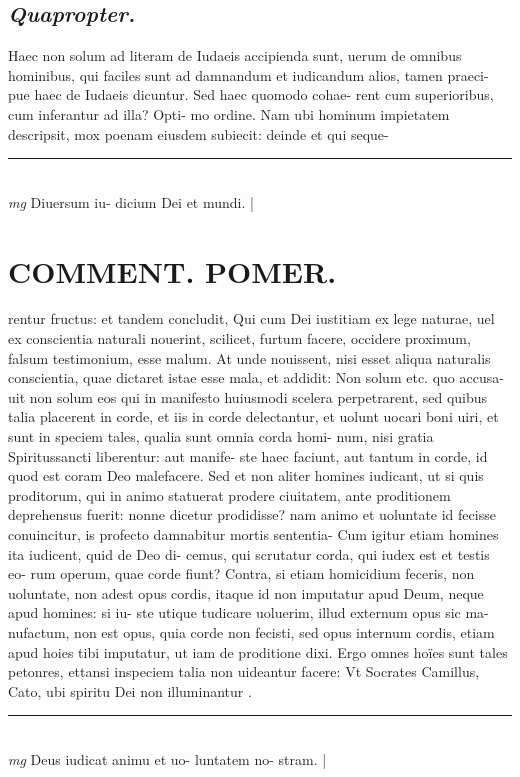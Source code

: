 \documentclass{article}
\begin{document}
\begin{pages}
\subsection*{\textit{Quapropter. }}\pstart Haec non solum ad literam de Iudaeis accipienda sunt, uerum de omnibus hominibus, qui faciles sunt ad damnandum et iudicandum alios, tamen praeci- pue haec de Iudaeis dicuntur. Sed haec quomodo cohae- rent cum superioribus, cum inferantur ad illa? Opti- mo ordine. Nam ubi hominum impietatem descripsit, mox poenam eiusdem subiecit: deinde et qui seque-  \pend
\vspace{0.5cm}\noindent
\vspace{0.2cm}\rule{1cm}{0.2pt}\\ 
\hspace{0.2cm}\textit{mg}
\footnotesize Diuersum iu- dicium Dei et mundi. 
\normalsize| 
\section*{COMMENT. POMER.  }\pstart rentur fructus: et tandem concludit, Qui cum Dei iustitiam ex lege naturae, uel ex conscientia naturali nouerint, scilicet, furtum facere, occidere proximum, falsum testimonium, esse malum. At unde nouissent, nisi esset aliqua naturalis conscientia, quae dictaret istae esse mala, et addidit: Non solum etc. quo accusa- uit non solum eos qui in manifesto huiusmodi scelera perpetrarent, sed quibus talia placerent in corde, et iis in corde delectantur, et uolunt uocari boni uiri, et sunt in speciem tales, qualia sunt omnia corda homi- num, nisi gratia Spiritussancti liberentur: aut manife- ste haec faciunt, aut tantum in corde, id quod est coram Deo malefacere. Sed et non aliter homines iudicant, ut si quis proditorum, qui in animo statuerat prodere ciuitatem, ante proditionem deprehensus fuerit: nonne dicetur prodidisse? nam animo et uoluntate id fecisse conuincitur, is profecto damnabitur mortis sententia- Cum igitur etiam homines ita iudicent, quid de Deo di- cemus, qui scrutatur corda, qui iudex est et testis eo- rum operum, quae corde fiunt? Contra, si etiam homicidium feceris, non uoluntate, non adest opus cordis, itaque  id non imputatur apud Deum, neque apud homines: si iu- ste utique tudicare uoluerim, illud externum opus sic ma- nufactum, non est opus, quia corde non fecisti, sed opus internum cordis, etiam apud hoies tibi imputatur, ut iam de proditione dixi. Ergo omnes hoïes sunt tales petonres, ettansi inspeciem talia non uideantur facere: Vt Socrates Camillus, Cato, ubi spiritu Dei non illuminantur .   \pend
\vspace{0.5cm}\noindent
\vspace{0.2cm}\rule{1cm}{0.2pt}\\ 
\hspace{0.2cm}\textit{mg}
\footnotesize Deus iudicat animu et uo- luntatem no- stram.  
\normalsize| 

\end{pages}
\end{document}
